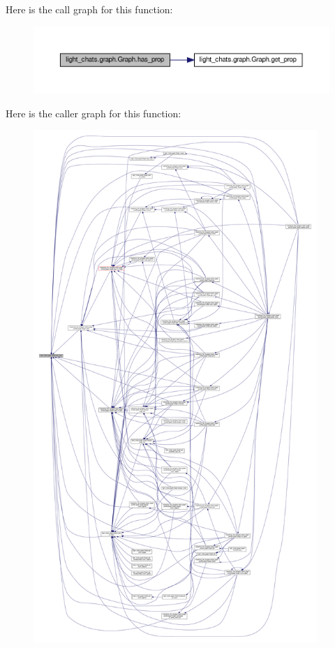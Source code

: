 Here is the call graph for this function\+:
\nopagebreak
\begin{figure}[H]
\begin{center}
\leavevmode
\includegraphics[width=350pt]{classlight__chats_1_1graph_1_1Graph_aa8a44c495d154f033ea3ced4d6f2e85d_cgraph}
\end{center}
\end{figure}
Here is the caller graph for this function\+:
\nopagebreak
\begin{figure}[H]
\begin{center}
\leavevmode
\includegraphics[height=550pt]{classlight__chats_1_1graph_1_1Graph_aa8a44c495d154f033ea3ced4d6f2e85d_icgraph}
\end{center}
\end{figure}
\mbox{\label{classlight__chats_1_1graph_1_1Graph_a43ff743c3d16850dc7d68d809c88c97d}} 

